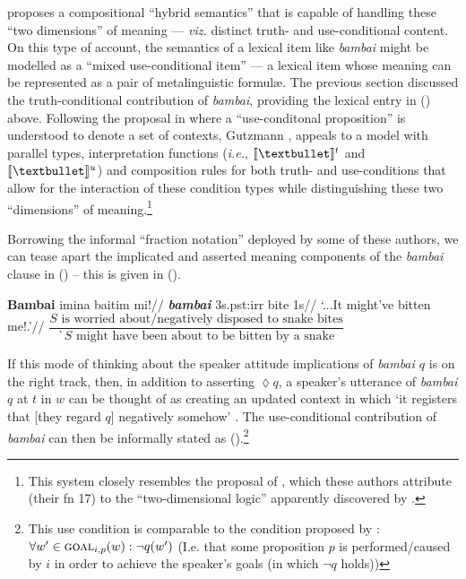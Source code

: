 \citet{Gutzmann2015} proposes a compositional ``hybrid semantics'' that is capable of handling these ``two dimensions'' of meaning --- \textit{viz.} distinct truth- and use-conditional content. On this type of account, the semantics of a lexical item like \textit{bambai} might be modelled as a ``mixed use-conditional item'' --- a lexical item whose meaning can be represented as a pair of metalinguistic formulæ.
The previous section discussed the truth-conditional contribution of \textit{bambai}, providing the lexical entry in () above. Following the proposal in \citet{Kaplan1999} where a ``use-conditonal proposition'' is understood to denote a set of contexts, Gutzmann \citeyearpar{Gutzmann2015}, appeals to a model with parallel types, interpretation functions (\textit{i.e.}, $ \denote[t]{•} $ and $ \denote[u]{•} $) and composition rules for both truth- and use-conditions that allow for the interaction of these condition types while distinguishing these two ``dimensions'' of meaning.\footnote{This system closely resembles the proposal of \citet{Karttunen1979}, which these authors attribute (their fn 17) to the ``two-dimensional logic'' apparently discovered by \citet{Herzberger1973}.}


 Borrowing the informal ``fraction notation'' deployed by some of these authors, we can tease apart the implicated and asserted meaning components of the \textit{bambai} clause in () -- this is given in (\nextx).%


\pex\a\begingl
\gla \textbf{Bambai} imina {baitim} mi!//
\glb \textsl{\textbf{bambai}} 3s.\gls{pst}:\gls{irr} bite 1s//
\glft`...It might've bitten me!.'\trailingcitation{[GT~01052017]}//\endgl
\a$\dfrac{\mathit S\text{ is worried about/negatively disposed to snake bites}}{\mathit `S\text{ might have been about to be bitten by a snake}}$
\xe

If this mode of thinking about the speaker attitude implications of \textit{bambai $q$} is on the right track, then, in addition to asserting $ \lozenge q $, a speaker's utterance of \textit{bambai $ q $} at $ t $ in $ w $ can be thought of as creating an updated context in which `it registers that [they regard $q$] negatively somehow' \citep[175]{Potts2007}.
The use-conditional contribution of \textit{bambai} can then be informally stated as (\nextx).\footnote{This use condition is comparable to the condition proposed by \citet{AnderBois2020}: $ \forall w'\in\textsc{goal}_{i,p}(w):\neg q(w') $ (I.e. that some proposition $ p $ is performed/caused by $ i $ in order to achieve the speaker's goals (in which $ \neg q $ holds))}

